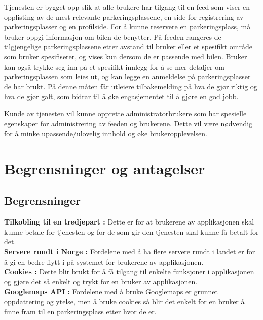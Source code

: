 \documentclass[12pt]{article}
\begin{document}
Tjenesten er bygget opp slik at alle brukere har tilgang til en feed som viser en opplisting av de mest relevante parkeringsplassene, en side for registrering av parkeringsplasser og en profilside. For å kunne reservere en parkeringsplass, må bruker oppgi informasjon om bilen de benytter. På feeden rangeres de tilgjengelige parkeringsplassene etter avstand til bruker eller et spesifikt område som bruker spesifiserer, og vises kun dersom de er passende med bilen. Bruker kan også trykke seg inn på et spesifikt innlegg for å se mer detaljer om parkeringsplassen som leies ut, og kan legge en anmeldelse på parkeringsplasser de har brukt. På denne måten får utleiere tilbakemelding på hva de gjør riktig og hva de gjør galt, som bidrar til å øke engasjementet til å gjøre en god jobb.

Kunde av tjenesten vil kunne opprette administratorbrukere som har spesielle egenskaper for administrering av feeden og brukerene. Dette vil være nødvendig for å minke upassende/ulovelig innhold og øke brukeropplevelsen.

\section{Begrensninger og antagelser}

    \subsection{Begrensninger}
        \textbf{Tilkobling til en tredjepart :} Dette er for at brukerene av applikasjonen skal kunne betale for tjenesten og for de som gir den tjenesten skal kunne få betalt for det.
        \\\textbf{Servere rundt i Norge :} Fordelene med å ha flere servere rundt i landet er for å gi en bedre flytt i på systemet for brukerene av applikasjonen.
        \\\textbf{Cookies :} Dette blir brukt for å få tilgang til enkelte funksjoner i applikasjonen og gjøre det så enkelt og trykt for en bruker av applikasjonen.
        \\\textbf{Googlemaps API :} Fordelene med å bruke Googlemaps er grunnet oppdattering og ytelse, men å bruke cookies så blir det enkelt for en bruker å finne fram til en parkeringsplass etter hvor de er.
\end{document}
